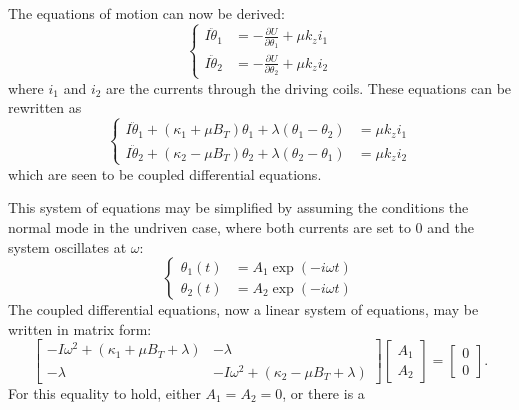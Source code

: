 \documentclass{article}
\begin{document}
The equations of motion can now be derived:
\begin{equation*}
    \begin{cases}
        I\ddot{\theta}_1 &= -\frac{\partial U}{\partial \theta_1} + \mu k_z i_1 \\
        I\ddot{\theta}_2 &= -\frac{\partial U}{\partial \theta_2} + \mu k_z i_2
    \end{cases}
\end{equation*}
where $i_1$ and $i_2$ are the currents through the driving coils. These equations can be rewritten as
\begin{equation*}
    \begin{cases}
        I\ddot{\theta}_1 + (\kappa_1 + \mu B_T)\theta_1 + \lambda(\theta_1 - \theta_2) &= \mu k_z i_1\\
        I\ddot{\theta}_2 + (\kappa_2 - \mu B_T)\theta_2 + \lambda(\theta_2 - \theta_1) &= \mu k_z i_2
    \end{cases}
\end{equation*}
which are seen to be coupled differential equations.

This system of equations may be simplified by assuming the conditions the normal mode in the undriven case, where both currents are set to 0 and the system oscillates at $\omega$:
\begin{equation*}
    \begin{cases}
        \theta_1(t) &= A_1 \exp(-i\omega t) \\
        \theta_2(t) &= A_2 \exp(-i\omega t)
    \end{cases}
\end{equation*}
The coupled differential equations, now a linear system of equations, may be written in matrix form:
\begin{equation*}
    \left[ \begin{matrix}
        -I\omega^2+(\kappa_1 + \mu B_T + \lambda)   &   -\lambda \\
        -\lambda                                    &   -I\omega^2+(\kappa_2 - \mu B_T + \lambda)
    \end{matrix} \right]\left[ \begin{matrix} A_1 \\ A_2 \end{matrix} \right] = \left[ \begin{matrix} 0\\0 \end{matrix} \right].
\end{equation*}
For this equality to hold, either $A_1=A_2=0$, or there is a
\end{document}
